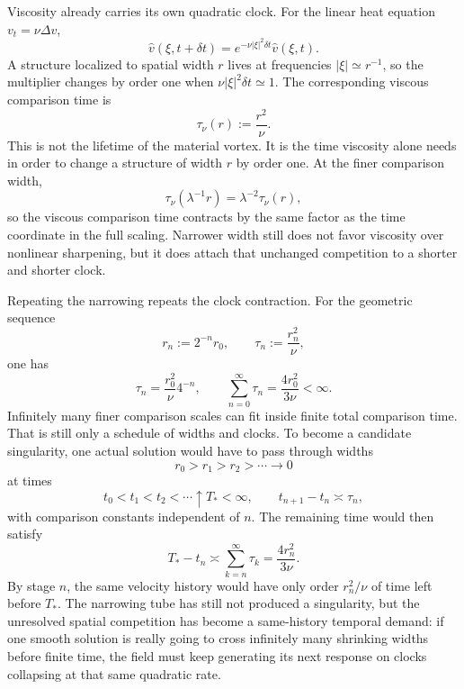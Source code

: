 Viscosity already carries its own quadratic clock. For the linear heat equation \(v_t=\nu\Delta v\),
\[
  \widehat v(\xi,t+\delta t)
  =
  e^{-\nu|\xi|^2\delta t}\widehat v(\xi,t).
\]
A structure localized to spatial width \(r\) lives at frequencies \(|\xi|\simeq r^{-1}\), so the multiplier changes by order one when \(\nu|\xi|^2\delta t\simeq1\). The corresponding viscous comparison time is
\[
  \tau_\nu(r)
  :=
  \frac{r^2}{\nu}.
\]
This is not the lifetime of the material vortex. It is the time viscosity alone needs in order to change a structure of width \(r\) by order one. At the finer comparison width,
\[
  \tau_\nu(\lambda^{-1}r)
  =
  \lambda^{-2}\tau_\nu(r),
\]
so the viscous comparison time contracts by the same factor as the time coordinate in the full \NavierStokes{} scaling. Narrower width still does not favor viscosity over nonlinear sharpening, but it does attach that unchanged competition to a shorter and shorter clock.


Repeating the narrowing repeats the clock contraction. For the geometric sequence
\[
  r_n:=2^{-n}r_0,
  \qquad
  \tau_n:=\frac{r_n^2}{\nu},
\]
one has
\[
  \tau_n
  =
  \frac{r_0^2}{\nu}4^{-n},
  \qquad
  \sum_{n=0}^{\infty}\tau_n
  =
  \frac{4r_0^2}{3\nu}
  <
  \infty.
\]
Infinitely many finer comparison scales can fit inside finite total comparison time. That is still only a schedule of widths and clocks. To become a candidate singularity, one actual solution would have to pass through widths
\[
  r_0>r_1>r_2>\cdots\longrightarrow0
\]
at times
\[
  t_0<t_1<t_2<\cdots\uparrow T_*<\infty,
  \qquad
  t_{n+1}-t_n\asymp\tau_n,
\]
with comparison constants independent of \(n\). The remaining time would then satisfy
\[
  T_*-t_n
  \asymp
  \sum_{k=n}^{\infty}\tau_k
  =
  \frac{4r_n^2}{3\nu}.
\]
By stage \(n\), the same velocity history would have only order \(r_n^2/\nu\) of time left before \(T_*\). The narrowing tube has still not produced a singularity, but the unresolved spatial competition has become a same-history temporal demand: if one smooth solution is really going to cross infinitely many shrinking widths before finite time, the field must keep generating its next response on clocks collapsing at that same quadratic rate.
